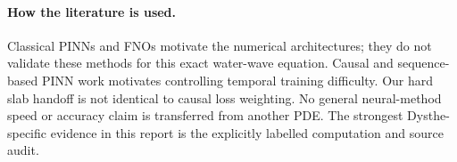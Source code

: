 \paragraph{How the literature is used.}
Classical PINNs and FNOs motivate the numerical architectures; they do not validate these methods for this exact water-wave equation. Causal and sequence-based PINN work \cite{causal,failure} motivates controlling temporal training difficulty. Our hard slab handoff is not identical to causal loss weighting. No general neural-method speed or accuracy claim is transferred from another PDE. The strongest Dysthe-specific evidence in this report is the explicitly labelled computation and source audit.
